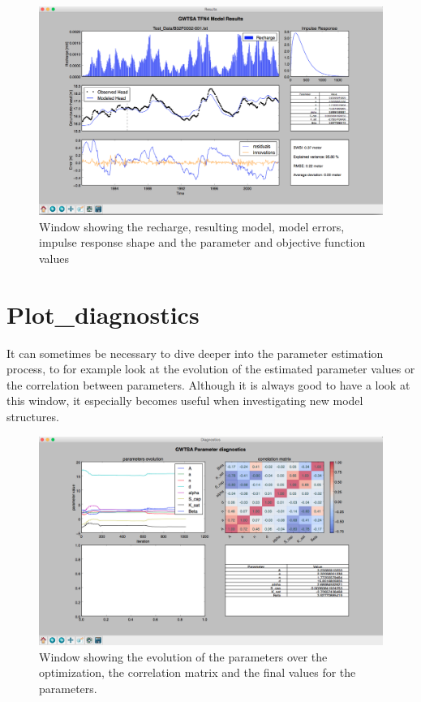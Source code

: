 \begin{figure}[h]
\centering
\includegraphics[width=1\linewidth]{Figures/plot_results}
\caption{Window showing the recharge, resulting model, model errors, impulse response shape and the parameter and objective function values}
\label{fig:plot_results}
\end{figure}


\section{Plot\_diagnostics}
It can sometimes be necessary to dive deeper into the parameter estimation process, to for example look at the evolution of the estimated parameter values or the correlation between parameters. Although it is always good to have a look at this window, it especially becomes useful when investigating new model structures. 

\begin{figure}[h]
\centering
\includegraphics[width=1\linewidth]{Figures/plot_diagnostics}
\caption{Window showing the evolution of the parameters over the optimization, the correlation matrix and the final values for the parameters.}
\label{fig:plot_diagnostics}
\end{figure}

